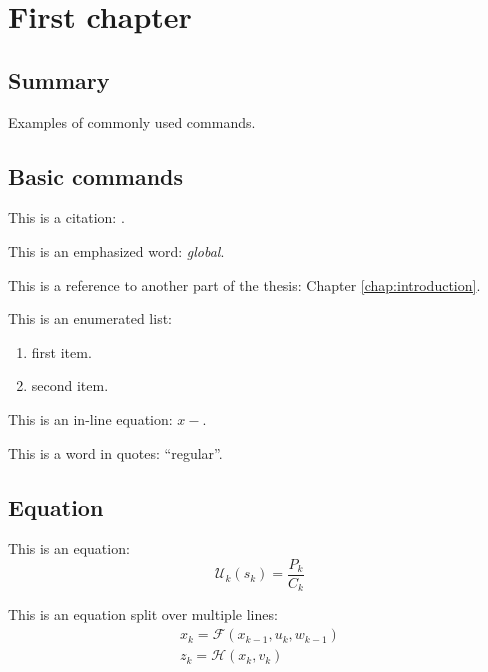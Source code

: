 
\chapter{First chapter}
\label{chap:first}
\ifpdf
    \graphicspath{{Chapter1/Figures/PNG/}{Chapter1/Figures/PDF/}{Chapter1/Figures/}}
\else
    \graphicspath{{Chapter1/Figures/EPS/}{Chapter1/Figures/}}
\fi

\section*{Summary}

Examples of commonly used commands.

\section{Basic commands}
\label{sec:basic_commands}

This is a citation: \cite{Cox91}.

This is an emphasized word: \emph{global}.

This is a reference to another part of the thesis: Chapter \ref{chap:introduction}.

This is an enumerated list:
\begin{enumerate}
\item first item.
\item second item.
\end{enumerate}

This is an in-line equation: $x-$.

This is a word in quotes: ``regular''.

\section{Equation}
\label{sec:equation}

This is an equation:
\begin{equation}
{\mathcal{U}}_k(s_k) = \frac{P_k}{C_k}
\label{eq:normal}
\end{equation}

This is an equation split over multiple lines:
\begin{equation}
\begin{array}{l}
x_{k}={\mathcal{F}}(x_{k-1},u_{k},w_{k-1})\\
z_{k}={\mathcal{H}}(x_{k},v_{k})
\label{eq:Split}
\end{array}
\end{equation}


